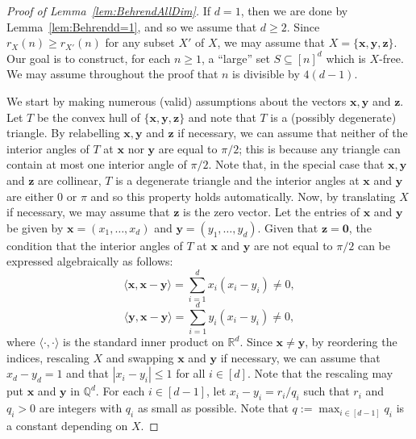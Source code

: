 \documentclass[12pt]{article}
\numberwithin{equation}{section}
\theoremstyle{definition}
\theoremstyle{remark}
\renewcommand{\vec}{\boldsymbol}
\begin{document}
\begin{proof}[Proof of Lemma~\ref{lem:BehrendAllDim}]
If $d=1$, then we are done by Lemma~\ref{lem:Behrendd=1}, and so we assume that $d\geq2$. Since $r_X(n)\geq r_{X'}(n)$ for any subset $X'$ of $X$, we may assume that $X=\{\vec{x},\vec{y},\vec{z}\}$. Our goal is to construct, for each $n\geq1$, a ``large'' set $S\subseteq[n]^d$ which is $X$-free. We may assume throughout the proof that $n$ is divisible by $4(d-1)$. 

We start by making numerous (valid) assumptions about the vectors $\vec{x},\vec{y}$ and $\vec{z}$. Let $T$ be the convex hull of $\{\vec{x},\vec{y},\vec{z}\}$ and note that $T$ is a (possibly degenerate) triangle. By relabelling $\vec{x},\vec{y}$ and $\vec{z}$ if necessary, we can assume that neither of the interior angles of $T$ at $\vec{x}$ nor $\vec{y}$ are equal to $\pi/2$; this is because any triangle can contain at most one interior angle of $\pi/2$. Note that, in the special case that $\vec{x},\vec{y}$ and $\vec{z}$ are collinear, $T$ is a degenerate triangle and the interior angles at $\vec{x}$ and $\vec{y}$ are either $0$ or $\pi$ and so this property holds automatically. Now, by translating $X$ if necessary, we may assume that $\vec{z}$ is the zero vector. Let the entries of $\vec{x}$ and $\vec{y}$ be given by $\vec{x}=(x_1,\dots,x_d)$ and $\vec{y}=(y_1,\dots,y_d)$. Given that $\vec{z}=\vec{0}$, the condition that the interior angles of $T$ at $\vec{x}$ and $\vec{y}$ are not equal to $\pi/2$ can be expressed algebraically as follows:
\begin{equation}\label{eq:notOrthogx}\langle \vec{x},\vec{x}-\vec{y}\rangle = \sum_{i=1}^dx_i(x_i-y_i) \neq0,\end{equation}
\begin{equation}\label{eq:notOrthogy}\langle \vec{y},\vec{x}-\vec{y}\rangle=\sum_{i=1}^dy_i(x_i-y_i) \neq0,\end{equation}
where $\langle\cdot,\cdot\rangle$ is the standard inner product on $\mathbb{R}^d$. Since $\vec{x}\neq \vec{y}$, by reordering the indices, rescaling $X$ and swapping $\vec{x}$ and $\vec{y}$ if necessary, we can assume that $x_d-y_d=1$ and that $|x_i-y_i|\leq 1$ for all $i\in [d]$. Note that the rescaling may put $\vec{x}$ and $\vec{y}$ in $\mathbb{Q}^d$. For each $i\in [d-1]$, let $x_i-y_i=r_i/q_i$ such that $r_i$ and $q_i>0$ are integers with $q_i$ as small as possible. Note that $q:=\max_{i\in [d-1]}q_i$ is a constant depending on $X$. 


\end{proof}
\end{document}

